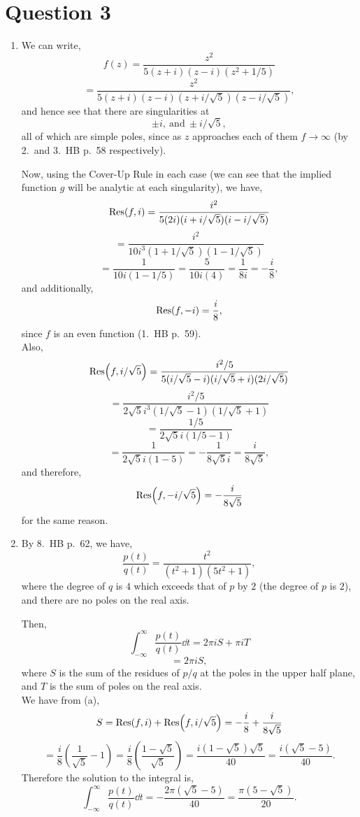 \section{Question 3}
\begin{enumerate}[label=(\alph*)]
    \item 
    We can write,
    \[
    f(z) = \frac{z^2}{5(z+i)(z-i)(z^2+1/5)}
    \]
    \[
    = \frac{z^2}{5(z+i)(z-i)(z+i/\sqrt{5})(z-i/\sqrt{5})},
    \]
    and hence see that there are singularities at
    \[
    \pm i,\ \mathrm{and}\ \pm i/\sqrt{5},
    \]
    all of which are simple poles, since as $z$ approaches each of them $f\rightarrow\infty$ (by 2.\ and 3.\ HB p.\ 58 respectively).

    Now, using the Cover-Up Rule in each case (we can see that the implied function $g$ will be analytic at each singularity), we have,
    \[
    \Res(f,i) = \frac{i^2}{5(2i)(i+i/\sqrt{5})(i-i/\sqrt{5})}
    \]
    \[
    = \frac{i^2}{10i^3(1+1/\sqrt{5})(1-1/\sqrt{5})}
    \]
    \[
    = \frac{1}{10i(1-1/5)} = \frac{5}{10i(4)} = \frac{1}{8i} = -\frac{i}{8},
    \]
    and additionally,
    \[
    \Res(f,-i) = \frac{i}{8},
    \]
    since $f$ is an even function (1.\ HB p.\ 59).
    \vs \\
    Also,
    \[
    \Res(f, i/\sqrt{5}) = \frac{i^2/5}{5(i/\sqrt{5} - i)(i/\sqrt{5} + i)(2i/\sqrt{5})}
    \]
    \[
    = \frac{i^2/5}{2\sqrt{5}i^3(1/\sqrt{5} - 1)(1/\sqrt{5} + 1)}
    \]
    \[
    = \frac{1/5}{2\sqrt{5}i(1/5 - 1)}
    \]
    \[
    = \frac{1}{2\sqrt{5}i(1-5)} = -\frac{1}{8\sqrt{5}i} = \frac{i}{8\sqrt{5}},
    \]
    and therefore,
    \[
    \Res(f,-i/\sqrt{5}) = -\frac{i}{8\sqrt{5}}
    \]
    for the same reason.

    \item 
    By 8.\ HB p.\ 62, we have,
    \[
    \frac{p(t)}{q(t)} = \frac{t^2}{(t^2+1)(5t^2+1)},
    \]
    where the degree of $q$ is $4$ which exceeds that of $p$ by $2$ (the degree of $p$ is $2$), and there are no poles on the real axis.

    Then,
    \[
    \int_{-\infty}^{\infty} \frac{p(t)}{q(t)}\dd t = 2\pi i S + \pi i T
    \]
    \[
    = 2\pi iS,
    \]
    where $S$ is the sum of the residues of $p/q$ at the poles in the upper half plane, and $T$ is the sum of poles on the real axis.
    \vs \\
    We have from (a),
    \[
    S = \Res(f,i) + \Res(f,i/\sqrt{5}) = -\frac{i}{8} + \frac{i}{8\sqrt{5}}
    \]
    \[
    = \frac{i}{8}\left(\frac{1}{\sqrt{5}} - 1\right) = \frac{i}{8}\left(\frac{1-\sqrt{5}}{\sqrt{5}}\right) = \frac{i(1-\sqrt{5})\sqrt{5}}{40} = \frac{i(\sqrt{5}-5)}{40}.
    \]
    Therefore the solution to the integral is,
    \[
    \int_{-\infty}^{\infty} \frac{p(t)}{q(t)}\dd t = -\frac{2\pi(\sqrt{5}-5)}{40} = \frac{\pi(5 - \sqrt{5})}{20}.
    \]


\end{enumerate}
